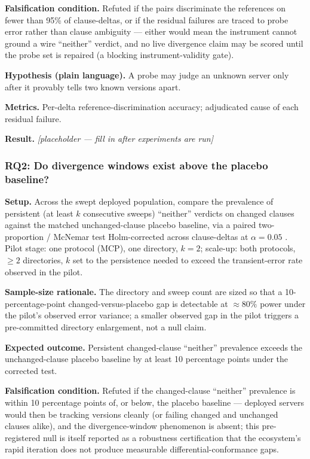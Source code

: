 \documentclass[11pt]{article}
\newcommand{\ph}{\textit{[placeholder --- fill in after experiments are run]}}
\begin{document}
\textbf{Falsification condition.} Refuted if the pairs discriminate the references on fewer than 95\% of clause-deltas, or if the residual failures are traced to probe error rather than clause ambiguity --- either would mean the instrument cannot ground a wire ``neither'' verdict, and no live divergence claim may be scored until the probe set is repaired (a blocking instrument-validity gate).

\textbf{Hypothesis (plain language).} A probe may judge an unknown server only after it provably tells two known versions apart.

\textbf{Metrics.} Per-delta reference-discrimination accuracy; adjudicated cause of each residual failure.

\textbf{Result.} \ph

\subsubsection{RQ2: Do divergence windows exist above the placebo baseline?}

\textbf{Setup.} Across the swept deployed population, compare the prevalence of persistent (at least $k$ consecutive sweeps) ``neither'' verdicts on changed clauses against the matched unchanged-clause placebo baseline, via a paired two-proportion / McNemar test Holm-corrected across clause-deltas at $\alpha = 0.05$ \citep{holm1979}. Pilot stage: one protocol (MCP), one directory, $k = 2$; scale-up: both protocols, $\geq 2$ directories, $k$ set to the persistence needed to exceed the transient-error rate observed in the pilot.

\textbf{Sample-size rationale.} The directory and sweep count are sized so that a 10-percentage-point changed-versus-placebo gap is detectable at $\approx 80\%$ power under the pilot's observed error variance; a smaller observed gap in the pilot triggers a pre-committed directory enlargement, not a null claim.

\textbf{Expected outcome.} Persistent changed-clause ``neither'' prevalence exceeds the unchanged-clause placebo baseline by at least 10 percentage points under the corrected test.

\textbf{Falsification condition.} Refuted if the changed-clause ``neither'' prevalence is within 10 percentage points of, or below, the placebo baseline --- deployed servers would then be tracking versions cleanly (or failing changed and unchanged clauses alike), and the divergence-window phenomenon is absent; this pre-registered null is itself reported as a robustness certification that the ecosystem's rapid iteration does not produce measurable differential-conformance gaps.
\end{document}
